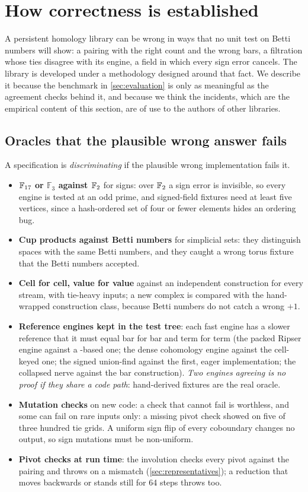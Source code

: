 \section{How correctness is established}\label{sec:correctness}

A persistent homology library can be wrong in ways that no unit test on Betti numbers will show: a pairing with the right
count and the wrong bars, a filtration whose ties disagree with its engine, a field in which every sign error cancels. The
library is developed under a methodology designed around that fact. We describe it because the benchmark in
\cref{sec:evaluation} is only as meaningful as the agreement checks behind it, and because we think the incidents,
which are the empirical content of this section, are of use to the authors of other libraries.

\subsection{Oracles that the plausible wrong answer fails}\label{sec:oracles}

A specification is \emph{discriminating} if the plausible wrong implementation fails it.
\begin{itemize}[leftmargin=1.5em, itemsep=2pt]
\item \textbf{$\mathbb{F}_{17}$ or $\mathbb{F}_3$ against $\mathbb{F}_2$} for signs: over $\mathbb{F}_2$ a sign error is invisible, so every engine is tested
  at an odd prime, and signed-field fixtures need at least five vertices, since a hash-ordered set of four or fewer elements
  hides an ordering bug.
\item \textbf{Cup products against Betti numbers} for simplicial sets: they distinguish spaces with the same Betti numbers, and they
  caught a wrong torus fixture that the Betti numbers accepted.
\item \textbf{Cell for cell, value for value} against an independent construction for every stream, with tie-heavy inputs;
  a new complex is compared with the hand-wrapped construction class, because Betti numbers do not catch a wrong $+1$.
\item \textbf{Reference engines kept in the test tree}: each fast engine has a slower reference that it must equal bar for bar
  and term for term (the packed Ripser engine against a -based one; the dense cohomology engine against the
  cell-keyed one; the signed union-find against the first, eager implementation; the collapsed nerve against the bar construction).
  \emph{Two engines agreeing is no proof if they share a code path}: hand-derived fixtures are the real oracle.
\item \textbf{Mutation checks} on new code: a check that cannot fail is worthless, and some can fail on rare inputs only: a missing
  pivot check showed on five of three hundred tie grids. A uniform sign flip of every coboundary changes no output, so
  sign mutations must be non-uniform.
\item \textbf{Pivot checks at run time}: the involution checks every pivot against the pairing and throws on a mismatch
  (\cref{sec:representatives}); a reduction that moves backwards or stands still for 64 steps throws too.
\end{itemize}

